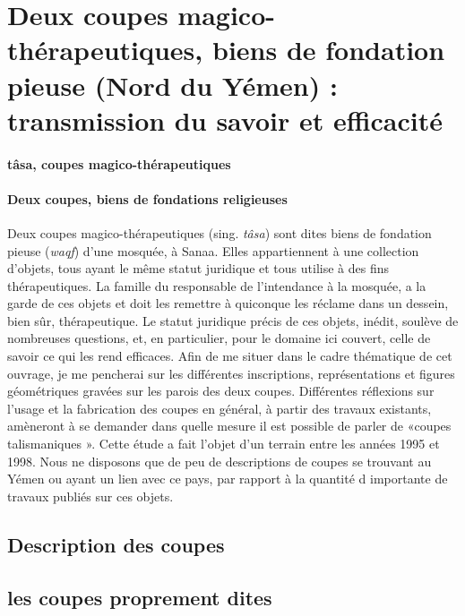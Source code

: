  



 
\section{Deux coupes magico-thérapeutiques, biens de fondation pieuse (Nord du Yémen) : transmission du savoir et efficacité}

\paragraph{tâsa, coupes magico-thérapeutiques}

 \paragraph{Deux coupes, biens de fondations religieuses}
Deux coupes magico-thérapeutiques (sing. \textit{tâsa}) sont dites biens de fondation pieuse ({\textit{waqf}}) d'une mosquée, à Sanaa. Elles appartiennent à une collection d'objets, tous ayant le même statut juridique et tous utilise à des fins thérapeutiques. La famille du responsable de l'intendance à la mosquée, a la garde de ces objets et doit les remettre à quiconque les réclame dans un dessein, bien sûr, thérapeutique. Le statut juridique précis de ces objets, inédit, soulève de nombreuses questions, et, en particulier, pour le domaine ici couvert, celle de savoir ce qui les rend efficaces.
Afin de me situer dans le cadre thématique de cet ouvrage, je me pencherai sur les différentes inscriptions, représentations et figures géométriques gravées sur les parois des deux coupes. Différentes réflexions sur l'usage et la fabrication des coupes en général, à partir des travaux existants, amèneront à se demander dans quelle mesure il est possible de parler de «coupes talismaniques ».
Cette étude a fait l'objet d'un terrain entre les années 1995 et 1998.
Nous ne disposons que de peu de descriptions de coupes se trouvant au Yémen ou ayant un lien avec ce pays, par rapport à la quantité d importante de travaux publiés sur ces objets.
\subsection{Description des coupes}


\subsection{les coupes proprement dites}

